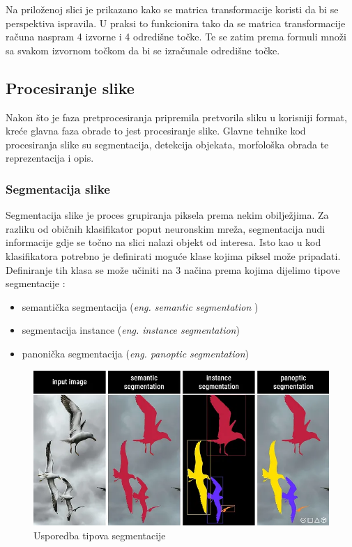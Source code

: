 \documentclass{foi}
\begin{document}
Na priloženoj slici je prikazano kako se matrica transformacije koristi da bi se perspektiva ispravila. U praksi to funkcionira tako da se matrica transformacije računa naspram 4 izvorne i 4 odredišne točke. Te se zatim prema formuli množi sa svakom izvornom točkom da bi se izračunale odredišne točke.

\subsection{Procesiranje slike}

Nakon što je faza pretprocesiranja pripremila pretvorila sliku u korisniji format, kreće glavna faza obrade to jest procesiranje slike. Glavne tehnike kod procesiranja slike su segmentacija, detekcija objekata, morfološka obrada te reprezentacija i opis.

\subsubsection{Segmentacija slike}

Segmentacija slike je proces grupiranja piksela prema nekim obilježjima. Za razliku od običnih klasifikator poput neuronskim mreža, segmentacija nudi informacije gdje se točno na slici nalazi objekt od interesa. Isto kao u kod klasifikatora potrebno je definirati moguće klase kojima piksel može pripadati. Definiranje tih klasa se može učiniti na 3 načina prema kojima dijelimo tipove segmentacije \cite{segmentacija}:

\begin{itemize}
    \item semantička segmentacija (\textit{eng. semantic segmentation })
    \item segmentacija instance (\textit{eng. instance segmentation})
    \item panonička segmentacija (\textit{eng. panoptic segmentation})
\end{itemize}

\begin{figure}[H]
    \centering
    \includegraphics[width=0.85\linewidth]{slike/sesgmentacija.png}
    \caption{Usporedba tipova segmentacije \cite{segmentacija}}
\end{figure}
\end{document}
